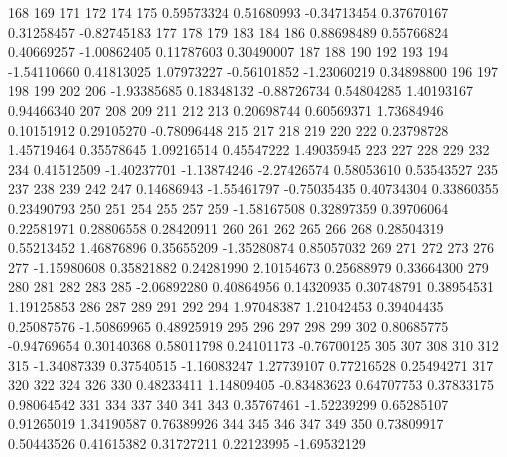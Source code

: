 \documentclass{article}
\begin{document}
\begin{Schunk}
\begin{Soutput}
        168         169         171         172         174         175 
 0.59573324  0.51680993 -0.34713454  0.37670167  0.31258457 -0.82745183 
        177         178         179         183         184         186 
 0.88698489  0.55766824  0.40669257 -1.00862405  0.11787603  0.30490007 
        187         188         190         192         193         194 
-1.54110660  0.41813025  1.07973227 -0.56101852 -1.23060219  0.34898800 
        196         197         198         199         202         206 
-1.93385685  0.18348132 -0.88726734  0.54804285  1.40193167  0.94466340 
        207         208         209         211         212         213 
 0.20698744  0.60569371  1.73684946  0.10151912  0.29105270 -0.78096448 
        215         217         218         219         220         222 
 0.23798728  1.45719464  0.35578645  1.09216514  0.45547222  1.49035945 
        223         227         228         229         232         234 
 0.41512509 -1.40237701 -1.13874246 -2.27426574  0.58053610  0.53543527 
        235         237         238         239         242         247 
 0.14686943 -1.55461797 -0.75035435  0.40734304  0.33860355  0.23490793 
        250         251         254         255         257         259 
-1.58167508  0.32897359  0.39706064  0.22581971  0.28806558  0.28420911 
        260         261         262         265         266         268 
 0.28504319  0.55213452  1.46876896  0.35655209 -1.35280874  0.85057032 
        269         271         272         273         276         277 
-1.15980608  0.35821882  0.24281990  2.10154673  0.25688979  0.33664300 
        279         280         281         282         283         285 
-2.06892280  0.40864956  0.14320935  0.30748791  0.38954531  1.19125853 
        286         287         289         291         292         294 
 1.97048387  1.21042453  0.39404435  0.25087576 -1.50869965  0.48925919 
        295         296         297         298         299         302 
 0.80685775 -0.94769654  0.30140368  0.58011798  0.24101173 -0.76700125 
        305         307         308         310         312         315 
-1.34087339  0.37540515 -1.16083247  1.27739107  0.77216528  0.25494271 
        317         320         322         324         326         330 
 0.48233411  1.14809405 -0.83483623  0.64707753  0.37833175  0.98064542 
        331         334         337         340         341         343 
 0.35767461 -1.52239299  0.65285107  0.91265019  1.34190587  0.76389926 
        344         345         346         347         349         350 
 0.73809917  0.50443526  0.41615382  0.31727211  0.22123995 -1.69532129 

\end{Soutput}
\end{Schunk}
\end{document}
